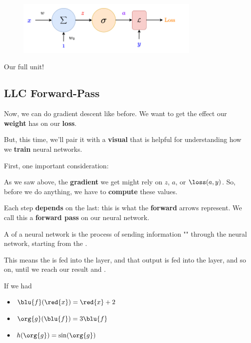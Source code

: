         \begin{figure}[H]
            \centering
            \includegraphics[width=90mm,scale=0.4]{images/nn_1_5_images/llc_as_neuron_loss.png}
        \end{figure}
        
        Our full unit!
        
    \secdiv
    
    \subsection*{LLC Forward-Pass}
    
        Now, we can do gradient descent like before. We want to get the effect our \textbf{weight} has on our \textbf{loss}.
        
        But, this time, we'll pair it with a \textbf{visual} that is helpful for understanding how we \textbf{train} neural networks. 
        
        First, one important consideration:
        
        As we saw above, the \textbf{gradient} we get might rely on $z$, $a$, or $\loss(a,y)$. So, before we do anything, we have to \textbf{compute} these values.
        
        Each step \textbf{depends} on the last: this is what the \textbf{forward} arrows represent. We call this a \textbf{forward pass} on our neural network.\\
        
        \begin{definition}
            A  of a neural network is the process of sending information "" through the neural network, starting from the .
            
            This means the  is fed into the  layer, and that output is fed into the  layer, and so on, until we reach our  result and .
        \end{definition}
        
        \miniex If we had 
        
        \begin{itemize}
            \item $\blu{f}(\red{x}) = \red{x}+2$
            
            \item $\org{g}(\blu{f}) = 3\blu{f}$
            
            \item $h(\org{g}) = \sin(\org{g})$
        \end{itemize}
        
